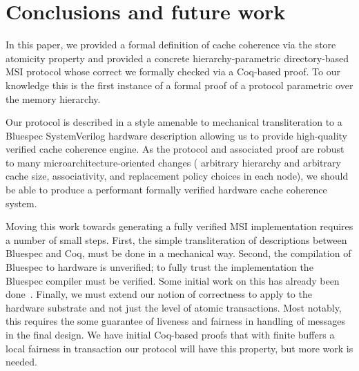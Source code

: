 \section{Conclusions and future work}

In this paper, we provided a formal definition of cache coherence via the store
atomicity property and provided a concrete hierarchy-parametric directory-based
MSI protocol whose correct we formally checked via a Coq-based proof. To our
knowledge this is the first instance of a formal proof of a protocol parametric
over the memory hierarchy.

Our protocol is described in a style amenable to mechanical transliteration to a
Bluespec SystemVerilog hardware description allowing us to provide high-quality
verified cache coherence engine. As the protocol and associated proof are robust
to many microarchitecture-oriented changes (\eg{} arbitrary hierarchy and
arbitrary cache size, associativity, and replacement policy choices in each
node), we should be able to produce a performant formally verified hardware
cache coherence system.

Moving this work towards generating a fully verified MSI implementation requires
a number of small steps. First, the simple transliteration of descriptions
between Bluespec and Coq, must be done in a mechanical way. Second, the
compilation of Bluespec to hardware is unverified; to fully trust the
implementation the Bluespec compiler must be verified. Some initial work on this
has already been done~\cite{TDBLP:conf/cav/BraibantC13}. Finally, we must extend
our notion of correctness to apply to the hardware substrate and not just the
level of atomic transactions. Most notably, this requires the some guarantee of
liveness and fairness in handling of messages in the final design. We have
initial Coq-based proofs that with finite buffers a local fairness in
transaction our protocol will have this property, but more work is needed. 


